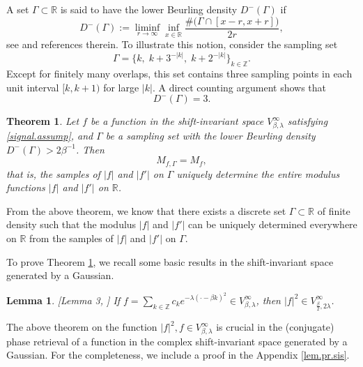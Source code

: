 \documentclass[11pt,oneside,reqno]{amsart}
\newtheorem{theorem}{Theorem}[section]
\newtheorem{lem}[thm]{Lemma}
\numberwithin{equation}{section}
\def\R{ {\mathbb R} }
\def\Z{ {\mathbb Z} }
\def\Vbeta{V^\infty_{\beta,\lambda}}
\begin{document}
A set $\Gamma\subset\R$  is said to have the lower Beurling density $D^{-}(\Gamma)$ if 
\begin{equation}\label{beurling.eq}
D^{-}(\Gamma):=\liminf_{r\rightarrow\infty} \inf_{x\in\R}\frac{\#\big(\Gamma\cap[x-r,x+r]\big)}{2r},
\end{equation}  see \cite{AG01,AST05,Cheng2019,CS2021,grochenig2020,GRS2018} and references therein. To illustrate this notion, consider the sampling set
\[
\Gamma=\{k,\;k+3^{-|k|},\;k+2^{-|k|}\}_{k\in\mathbb Z}.
\]
Except for finitely many overlaps, this set contains three sampling points in each
unit interval $[k,k+1)$ for large $|k|$. A direct counting argument shows that
\[
D^{-}(\Gamma)=3.
\]





 

\begin{theorem}\label{cpr.sis.thm1}
{\rm 
Let $f$  be a function in the shift-invariant space $V^\infty_{\beta, \lambda}$ satisfying \eqref{signal.assump}, and $\Gamma$ be a sampling set with the lower Beurling density $D^-(\Gamma)>2\beta^{-1}$. Then 
\begin{equation*}
M_{f,\Gamma}=M_f, 
\end{equation*} 
that is, the samples of $|f|$ and $|f'|$ on $\Gamma$ uniquely determine the
entire modulus functions $|f|$ and $|f'|$ on $\mathbb R$.} 
\end{theorem}

From the above theorem, we know that there exists a discrete set $\Gamma \subset \mathbb{R}$ of finite density such that
the modulus $|f|$ and $|f'|$ can be uniquely determined everywhere on $\mathbb{R}$  from the samples of $|f|$ and $|f'|$ on $\Gamma$.

 
 
 
 
\smallskip 

  
  To prove Theorem \ref{cpr.sis.thm1}, we recall some basic results in the shift-invariant space generated by a Gaussian.%


\begin{lem}\label{f.abs.lem}{\rm[Lemma 3, \cite{grochenig2020}]}
{\rm If $f=\sum_{k\in\Z}c_k e^{-\lambda(\cdot-\beta k)^2}\in V^\infty_{\beta, \lambda}$, 
 then $|f|^2\in V^\infty_{\frac{\beta}{2}, 2\lambda}$.
}
\end{lem}
The above theorem on the function $|f|^2, f\in \Vbeta$ is crucial in the  (conjugate) phase retrieval  of a function  in the complex shift-invariant space generated by a Gaussian. 
For the completeness, we include a proof in the Appendix \ref{lem.pr.sis}. 
\end{document}
